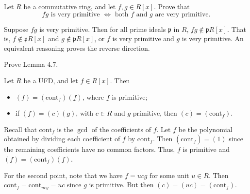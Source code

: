 \documentclass[../../master.tex]{subfiles}
\begin{document}
    \begin{problem}
        Let $R$ be a commutative ring, and let $f, g \in R[x]$. Prove that
        \[
            fg \text{ is very primitive } \Longleftrightarrow \text{ both } f
            \text{ and } g \text{ are very primitive.}
        \] 
    \end{problem}

    \begin{solution}
        Suppose $fg$ is very primitive. Then for all prime ideals
        $\mathfrak{p}$ in $R$, $fg \notin \mathfrak{p}R[x]$. That is, $f \notin
        \mathfrak{p}R[x]$ and $g \notin \mathfrak{p}R[x]$, or $f$ is very
        primitive and $g$ is very primitive. An equivalent reasoning proves the
        reverse direction.
    \end{solution}

    \begin{problem}
        Prove Lemma 4.7.
        \begin{proposition}[Lemma 4.7]
            Let $R$ be a UFD, and let $f \in R[x]$. Then
            \begin{itemize} 
                \item $(f) = (\mathrm{cont}_f)(\underline{f})$,
                where $\underline{f}$ is primitive;
                \item if $(f) = (c)(g)$, with $c
                \in R$ and $g$ primitive, then $(c) = (\mathrm{cont}_f)$.  
            \end{itemize}
        \end{proposition}
    \end{problem}

    \begin{solution}
        Recall that $\mathrm{cont}_f$ is the $\gcd$ of the coefficients of $f$.
        Let $\underline{f}$ be the polynomial obtained by dividing each
        coefficient of $f$ by $\mathrm{cont}_f$. Then
        $(\mathrm{cont}_{\underline{f}}) = (1)$ since the remaining coefficients
        have no common factors. Thus, $\underline{f}$ is primitive and $(f) =
        (\mathrm{cont}_f) (\underline{f})$.

        For the second point, note that we have $f = ucg$ for some unit $u \in
        R$. Then $\mathrm{cont}_f = \mathrm{cont}_{ucg} = uc$ since $g$ is
        primitive. But then $(c) = (uc) = (\mathrm{cont}_f)$.
    \end{solution}
\end{document}
